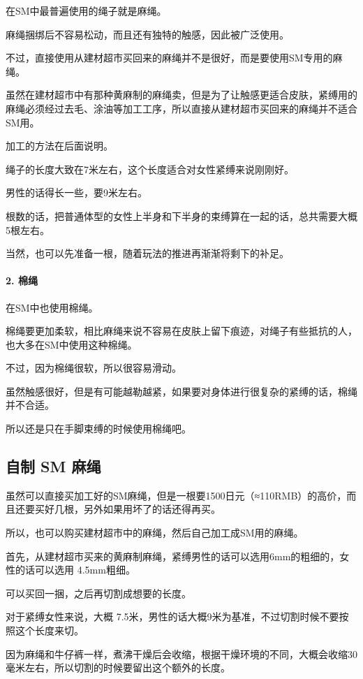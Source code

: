 \documentclass[12pt,UTF8]{ctexbook}
\begin{document}
在SM中最普遍使用的绳子就是麻绳。

麻绳捆绑后不容易松动，而且还有独特的触感，因此被广泛使用。

不过，直接使用从建材超市买回来的麻绳并不是很好，而是要使用SM专用的麻绳。

虽然在建材超市中有那种黄麻制的麻绳卖，但是为了让触感更适合皮肤，紧缚用的麻绳必须经过去毛、涂油等加工工序，所以直接从建材超市买回来的麻绳并不适合SM用。

加工的方法在后面说明。

绳子的长度大致在7米左右，这个长度适合对女性紧缚来说刚刚好。

男性的话得长一些，要9米左右。

根数的话，把普通体型的女性上半身和下半身的束缚算在一起的话，总共需要大概5根左右。

当然，也可以先准备一根，随着玩法的推进再渐渐将剩下的补足。

\paragraph{2. 棉绳}

在SM中也使用棉绳。

棉绳要更加柔软，相比麻绳来说不容易在皮肤上留下痕迹，对绳子有些抵抗的人，也大多在SM中使用这种棉绳。

不过，因为棉绳很软，所以很容易滑动。

虽然触感很好，但是有可能越勒越紧，如果要对身体进行很复杂的紧缚的话，棉绳并不合适。

所以还是只在手脚束缚的时候使用棉绳吧。

\subsection{自制 SM 麻绳}

虽然可以直接买加工好的SM麻绳，但是一根要1500日元（≈110RMB）的高价，而且还要买好几根，另外如果用坏了的话还得再买。

所以，也可以购买建材超市中的麻绳，然后自己加工成SM用的麻绳。

首先，从建材超市买来的黄麻制麻绳，紧缚男性的话可以选用6mm的粗细的，女性的话可以选用 4.5mm粗细。

可以买回一捆，之后再切割成想要的长度。

对于紧缚女性来说，大概 7.5米，男性的话大概9米为基准，不过切割时候不要按照这个长度来切。

因为麻绳和牛仔裤一样，煮沸干燥后会收缩，根据干燥环境的不同，大概会收缩30毫米左右，所以切割的时候要留出这个额外的长度。
\end{document}

